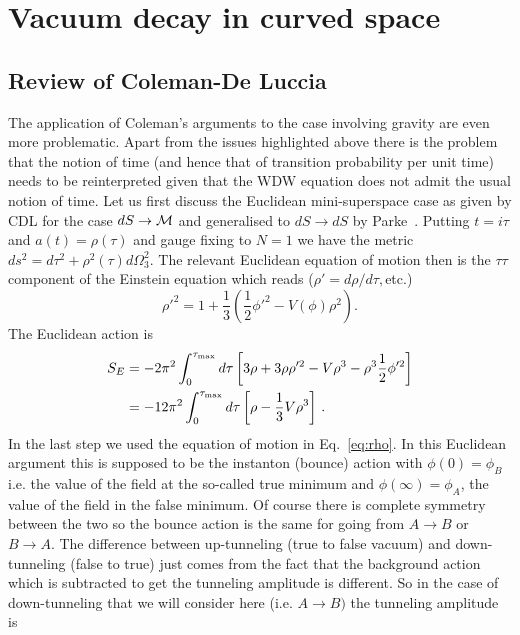 \documentclass[a4paper,11pt]{article}
\numberwithin{equation}{section}
\begin{document}
\section{Vacuum decay in curved space}
\label{sec:DecayCurvedSpace}

\subsection{Review of Coleman-De Luccia}
\label{sec:CDLReview}

The application of Coleman's arguments to the case involving gravity are even more problematic. Apart from the issues highlighted above there is the problem that the notion of time (and hence that of transition probability per unit time) needs to be reinterpreted given that the WDW equation does not admit the usual notion of time. Let us first discuss the Euclidean mini-superspace case as given by CDL for the case $dS\rightarrow{\cal M}$ and generalised to $dS\rightarrow dS$
by Parke~\cite{Parke:1982pm}. Putting $t=i\tau$ and $a(t)=\rho(\tau)$ and gauge fixing to $N=1$ we have the metric $ds^{2}=d\tau^{2}+\rho^{2}(\tau)d\Omega_{3}^{2}$. The relevant Euclidean equation of motion then is the $\tau\tau$ component of the Einstein equation which reads ($\rho'=d\rho/d\tau,$etc.)
\begin{equation}
\rho'^{2}=1+\frac{1}{3}\left(\frac{1}{2}\phi'^{2}-V(\phi)\rho^{2}\right).\label{eq:rho}
\end{equation}
The Euclidean action is 
\begin{align}
S_{E} & =-2\pi^{2}\int_{0}^{\tau_{{\rm max}}}d\tau\left[3\rho+3\rho\rho'^{2}-V\rho^{3}-\rho^{3}\frac{1}{2}\phi'^{2}\right]\nonumber \\
 & =-12\pi^{2}\int_{0}^{\tau_{{\rm max}}}d\tau\left[\rho-\frac{1}{3}V\rho^{3}\right]\,.\label{eq:SE}
\end{align}
In the last step we used the equation of motion in Eq.~\eqref{eq:rho}. In this Euclidean argument this is supposed to be the instanton (bounce) action with $\phi(0)=\phi_{B}$ i.e. the value of the field at the so-called true minimum and $\phi(\infty)=\phi_{A}$, the value of the field in the false minimum. Of course there is complete symmetry between the two so the bounce action is the same for going from $A\rightarrow B$ or $B\rightarrow A$. The difference between up-tunneling (true to false vacuum) and down-tunneling (false to true) just comes from the fact that the background action which is subtracted to get the tunneling amplitude is different. So in the case of down-tunneling that we will consider here (i.e. $A\rightarrow B)$ the tunneling amplitude is
\end{document}
